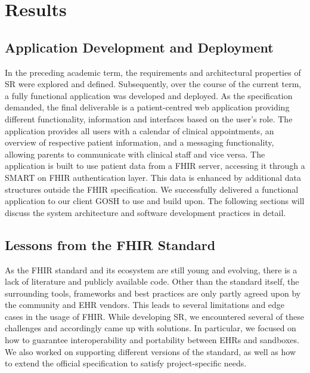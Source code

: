 \documentclass[sigconf]{acmart}
\begin{document}
\section{Results}
\label{sec:results}


\subsection{Application Development and Deployment}

In the preceding academic term, the requirements and architectural properties of SR were explored and defined. Subsequently, over the course of the current term, a fully functional application was developed and deployed. As the specification demanded, the final deliverable is a patient-centred web application providing different functionality, information and interfaces based on the user's role. The application provides all users with a calendar of clinical appointments, an overview of respective patient information, and a messaging functionality, allowing parents to communicate with clinical staff and vice versa. The application is built to use patient data from a FHIR server, accessing it through a SMART on FHIR authentication layer. This data is enhanced by additional data structures outside the FHIR specification. We successfully delivered a functional application to our client GOSH to use and build upon. The following sections will discuss the system architecture and software development practices in detail.


\subsection{Lessons from the FHIR Standard}

As the FHIR standard and its ecosystem are still young and evolving, there is a lack of literature and publicly available code. Other than the standard itself, the surrounding tools, frameworks and best practices are only partly agreed upon by the community and EHR vendors. This leads to several limitations and edge cases in the usage of FHIR. While developing SR, we encountered several of these challenges and accordingly came up with solutions. In particular, we focused on how to guarantee interoperability and portability between EHRs and sandboxes. We also worked on supporting different versions of the standard, as well as how to extend the official specification to satisfy project-specific needs.%
\end{document}
